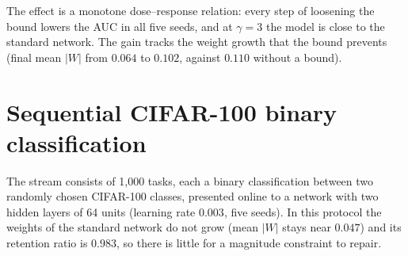 \documentclass[11pt,a4paper]{article}
\begin{document}
\begin{table}[h]
  \centering\small
  \caption{Triangle wave with different amplitudes $A=\gamma b$ (200 tasks $\times$ 5{,}000 examples, five
  seeds). $\Delta$AUC is the paired difference to $\gamma=1$ with a 95\% bootstrap interval.}
  \label{tab:gamma}
\end{table}

The effect is a monotone dose--response relation: every step of loosening the bound lowers the AUC in all five
seeds, and at $\gamma=3$ the model is close to the standard network. The gain tracks the weight growth that
the bound prevents (final mean $|W|$ from $0.064$ to $0.102$, against $0.110$ without a bound).

\section{Sequential CIFAR-100 binary classification}\label{app:cifar}

The stream consists of 1{,}000 tasks, each a binary classification between two randomly chosen CIFAR-100
classes, presented online to a network with two hidden layers of 64 units (learning rate $0.003$, five seeds).
In this protocol the weights of the standard network do not grow (mean $|W|$ stays near $0.047$) and its
retention ratio is $0.983$, so there is little for a magnitude constraint to repair.
\end{document}
